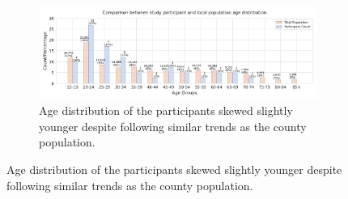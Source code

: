 \begin{figure}[h]
    \centering
    \begin{subfigure}[b]{\textwidth}
        \centering
        \includegraphics[width=\textwidth]{content/image/demo/demo_age_group_vertical.pdf}
        \caption{Age distribution of the participants skewed slightly younger despite following similar trends as the county population.}
        \label{fig:demoAge}
    \end{subfigure}
    
    \vspace{0.5cm} %


\end{figure}
